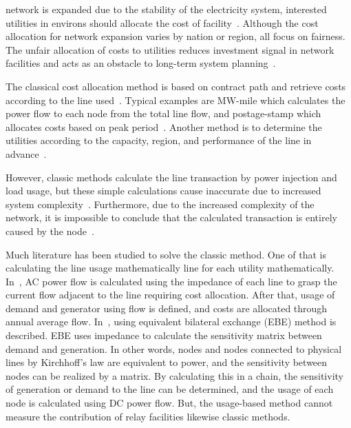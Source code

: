 \documentclass[journal]{IEEEtran} %
\begin{document}
 network is expanded due to the stability of the electricity system, interested utilities in environs should allocate the cost of facility~\cite{shahidehpour2003market}. Although the cost allocation for network expansion varies by nation or region, all focus on fairness. The unfair allocation of costs to utilities reduces investment signal in network facilities and acts as an obstacle to long-term system planning~\cite{ruiz2007effective}. 

The classical cost allocation method is based on contract path and retrieve costs according to the line used~\cite{shahidehpour2003market}. Typical examples are MW-mile which calculates the power flow to each node from the total line flow, and postage-stamp which allocates costs based on peak period~\cite{radzi2011modified, kirschen1997contributions, ma2021comparison}. Another method is to determine the utilities according to the capacity, region, and performance of the line in advance~\cite{fink2011survey}. 

However, classic methods calculate the line transaction by power injection and load usage, but these simple calculations cause inaccurate due to increased system complexity~\cite{radzi2011modified}. Furthermore, due to the increased complexity of the network, it is impossible to conclude that the calculated transaction is entirely caused by the node~\cite{rivier2020cost}.

Much literature has been studied to solve the classic method. One of that is calculating the line usage mathematically line for each utility mathematically. In~\cite{conejo2007z_, abhyankar2006optimization}, AC power flow is calculated using the impedance of each line to grasp the current flow adjacent to the line requiring cost allocation. After that, usage of demand and generator using flow is defined, and costs are allocated through annual average flow. In~\cite{galiana2003transmission, gil2005multiarea}, using equivalent bilateral exchange (EBE) method is described. EBE uses impedance to calculate the sensitivity matrix between demand and generation. In other words, nodes and nodes connected to physical lines by Kirchhoff's law are equivalent to power, and the sensitivity between nodes can be realized by a matrix. By calculating this in a chain, the sensitivity of generation or demand to the line can be determined, and the usage of each node is calculated using DC power flow. But, the usage-based method cannot measure the contribution of relay facilities likewise classic methods.
\end{document}

